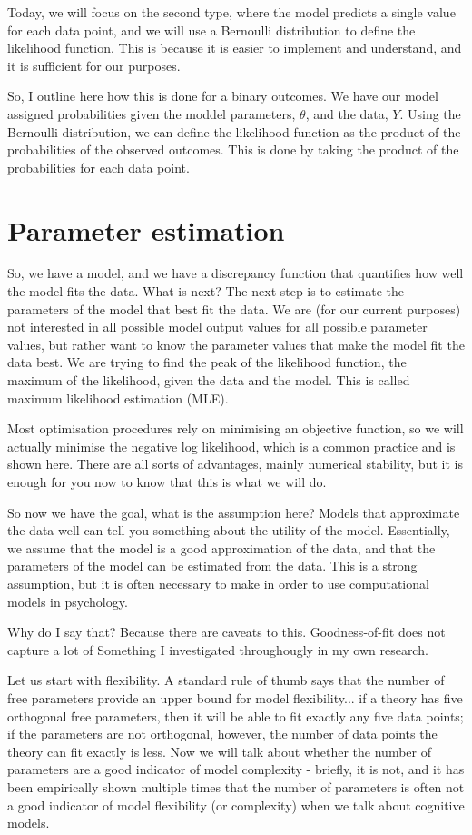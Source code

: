\documentclass[12pt]{article}
\begin{document}
Today, we will focus on the second type, where the model predicts a single value for each data point, and we will use a Bernoulli distribution to define the likelihood function. This is because it is easier to implement and understand, and it is sufficient for our purposes.

So, I outline here how this is done for a binary outcomes. We have our model assigned probabilities given the moddel parameters, $\theta$, and the data, $Y$. Using the Bernoulli distribution, we can define the likelihood function as the product of the probabilities of the observed outcomes. This is done by taking the product of the probabilities for each data point.

\section{Parameter estimation}

So, we have a model, and we have a discrepancy function that quantifies how well the model fits the data. What is next? The next step is to estimate the parameters of the model that best fit the data. We are (for our current purposes) not interested in all possible model output values for all possible parameter values, but rather want to know the parameter values that make the model fit the data best. We are trying to find the peak of the likelihood function, the maximum of the likelihood, given the data and the model. This is called maximum likelihood estimation (MLE). 

Most optimisation procedures rely on minimising an objective function, so we will actually minimise the negative log likelihood, which is a common practice and is shown here. There are all sorts of advantages, mainly numerical stability, but it is enough for you now to know that this is what we will do.

So now we have the goal, what is the assumption here? Models that approximate the data well can tell you something about the utility of the model. Essentially, we assume that the model is a good approximation of the data, and that the parameters of the model can be estimated from the data. This is a strong assumption, but it is often necessary to make in order to use computational models in psychology.

Why do I say that? Because there are caveats to this. Goodness-of-fit does not capture a lot of  Something I investigated throughougly in my own research.

Let us start with flexibility. A standard rule of thumb says that the number of free parameters provide an upper bound for model flexibility... if a theory has five orthogonal free parameters, then it will be able to fit exactly any five data points; if the parameters are not orthogonal, however, the number of data points the theory can fit exactly is less. Now we will talk about whether the number of parameters are a good indicator of model complexity - briefly, it is not, and it has been empirically shown multiple times that the number of parameters is often not a good indicator of model flexibility (or complexity) when we talk about cognitive models. 
\end{document}
